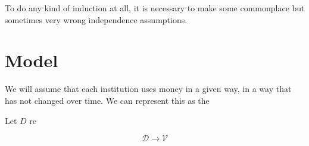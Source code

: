 \documentclass[paper.tex]{subfiles}
\newcommand{\D}{\mathcal{D}}
\newcommand{\V}{\mathcal{V}}
\begin{document}
	
	To do any kind of induction at all, it is necessary to make some commonplace but sometimes very wrong independence assumptions. 
	\section{Model}
	We will assume that each institution uses money in a given way, in a way that has not changed over time. We can represent this as the 
	
	Let $D$ re
		
	\[ \D \to \V \]
\end{document}
